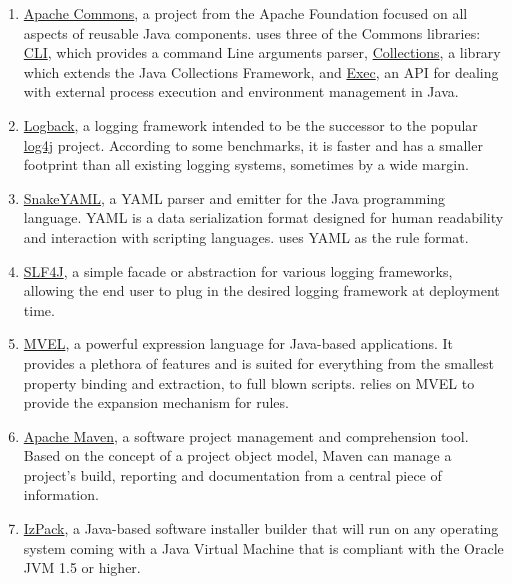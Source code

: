 \documentclass[a4paper,twoside,12pt]{memoir}
\begin{document}
\begin{enumerate}
\item \href{http://commons.apache.org}{Apache Commons}, a project from the Apache Foundation focused on all aspects of reusable Java components. \arara uses three of the Commons libraries: \href{http://commons.apache.org/cli/}{CLI}, which provides a command Line arguments parser, \href{http://commons.apache.org/collections/}{Collections}, a library which  	extends the Java Collections Framework, and \href{http://commons.apache.org/exec/}{Exec}, an API for dealing with external process execution and environment management in Java.

\item \href{http://logback.qos.ch}{Logback}, a logging framework intended to be the successor to the popular \href{http://logging.apache.org/log4j/}{log4j} project. According to some benchmarks, it is faster and has a smaller footprint than all existing logging systems, sometimes by a wide margin.

\item \href{http://code.google.com/p/snakeyaml}{SnakeYAML}, a YAML parser and emitter for the Java programming language. YAML is a data serialization format designed for human readability and interaction with scripting languages. \arara uses YAML as the rule format.

\item \href{http://www.slf4j.org/}{SLF4J}, a simple facade or abstraction for various logging frameworks, allowing the end user to plug in the desired logging framework at deployment time.

\item \href{http://mvel.codehaus.org}{MVEL}, a powerful expression language for Java-based applications. It provides a plethora of features and is suited for everything from the smallest property binding and extraction, to full blown scripts. \arara relies on MVEL to provide the expansion mechanism for rules.

\item \href{http://maven.apache.org/}{Apache Maven}, a software project management and comprehension tool. Based on the concept of a project object model, Maven can manage a project's build, reporting and documentation from a central piece of information. 

\item \href{http://izpack.github.com}{IzPack}, a Java-based software installer builder that will run on any operating system coming with a Java Virtual Machine that is compliant with the Oracle JVM 1.5 or higher.
\end{enumerate}
\end{document}
